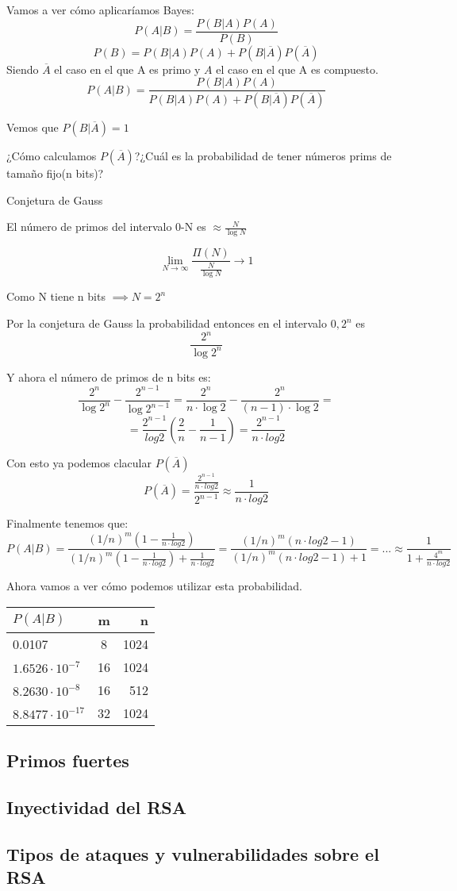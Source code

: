Vamos a ver cómo aplicaríamos Bayes:
$$P(A|B) = \frac{P(B|A)P(A)}{P(B)}$$
$$P(B) = P(B|A)P(A) + P(B|\overline{A})P(\overline{A})$$
Siendo $\overline{A}$ el caso en el que A es primo y $A$ el caso en el que A es compuesto.
$$P(A|B) = \frac{P(B|A)P(A)}{P(B|A)P(A) + P(B|\overline{A})P(\overline{A})}$$

Vemos que $P(B|\overline{A}) = 1$

¿Cómo calculamos $P(\overline{A})$?¿Cuál es la probabilidad de tener números prims de tamaño fijo(n bits)?

Conjetura de Gauss

El número de primos del intervalo {0-N} es $\approx \frac{N}{\log N}$

$$\lim_{N\rightarrow \infty} \frac{\Pi(N)}{\frac{N}{\log N}} \rightarrow 1$$

Como N tiene n bits $\implies N = 2^n$

Por la conjetura de Gauss la probabilidad entonces en el intervalo ${0, 2^n}$ es
$$\frac{2^n}{\log 2^n}$$

Y ahora el número de primos de n bits es:
$$\frac{2^n}{\log 2^n} - \frac{2^{n-1}}{\log 2^{n-1}} = \frac{2^n}{n \cdot\log 2}- \frac{2^n}{(n-1)\cdot\log 2} =$$
$$ = \frac{2^{n-1}}{log 2}(\frac{2}{n} - \frac{1}{n-1}) = \frac{2^{n-1}}{n \cdot log2}$$

Con esto ya podemos clacular $P(\overline{A})$
$$P(\overline{A}) = \frac{\frac{2^{n-1}}{n \cdot log2}}{2^{n-1}} \approx\frac{1}{n \cdot log 2}$$

Finalmente tenemos que:
$$P(A|B) = \frac{(1/n)^m (1- \frac{1}{n \cdot log 2})}{(1/n)^m (1 - \frac{1}{n \cdot log 2}) + \frac{1}{n \cdot log 2}} = \frac{(1/n)^m (n \cdot log 2 -1)}{(1/n)^m (n \cdot log 2 -1) +1} = ... \approx\frac{1}{1+ \frac{4^m}{n\cdot log 2}}$$

Ahora vamos a ver cómo podemos utilizar esta probabilidad.


\begin{center}
	
	\begin{tabular}{l | c  r}
		$P(A|B)$ & m & n \\
		\hline
	0.0107 & 8 & 1024 \\
	\hline
		$1.6526 \cdot 10^{-7}$ & 16 & 1024\\
		\hline
	$8.2630 \cdot 10^{-8}$ & 16 & 512 \\
		\hline
		$8.8477 \cdot 10^{-17}$ & 32 & 1024
	
	\end{tabular}
\end{center}



\subsection{Primos fuertes}
\subsection{Inyectividad del RSA}
\subsection{Tipos de ataques y vulnerabilidades sobre el RSA}